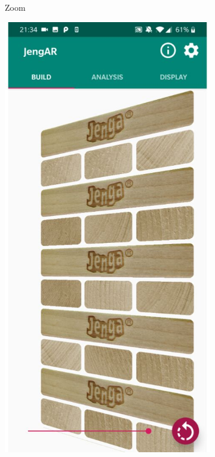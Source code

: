 \begin{figure}[ht]
\begin{subfigure}{0.22\textwidth}
\caption{Zoom} \label{fig:buildzoom}
\end{subfigure}
\hspace*{\fill}
\begin{subfigure}{0.23\textwidth}
\includegraphics[width=\linewidth]{images/implementation/build-rotate}

\end{subfigure}
\end{figure}
